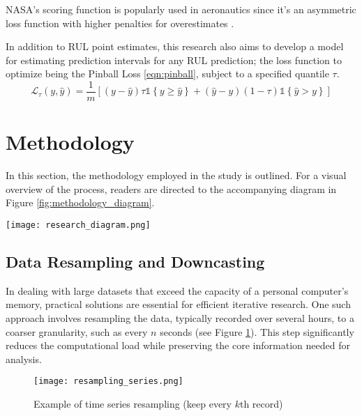 \documentclass{IEEEtran}
\begin{document}
            NASA's scoring function is popularly used in aeronautics since it's an asymmetric loss function with higher penalties for overestimates \cite{saxena2008damage}.

            In addition to RUL point estimates, this research also aims to develop a model for estimating prediction intervals for any RUL prediction; the loss function to optimize being the Pinball Loss \eqref{eqn:pinball}, subject to a specified quantile $\tau$.
            \begin{equation}\label{eqn:pinball}
                \mathcal{L}_\tau(y, \hat{y}) = \frac{1}{m} \left[(y - \hat{y}) \tau \mathds{1} \left\{y \geq \hat{y}\right\} + (\hat{y} - y) (1 - \tau) \mathds{1} \left\{\hat{y} > y\right\} \right]
            \end{equation}

    \section{Methodology} \label{sec:methodology}

        In this section, the methodology employed in the study is outlined. For a visual overview of the process, readers are directed to the accompanying diagram in Figure \ref{fig:methodology_diagram}.
        \begin{figure*}[!htbp]
            \centering
            \texttt{[image: research\_diagram.png]}
            \caption{Proposed Methodology Overview}
            \label{fig:methodology_diagram}
        \end{figure*}

        \subsection{Data Resampling and Downcasting} \label{sec:resampling}

            In dealing with large datasets that exceed the capacity of a personal computer's memory, practical solutions are essential for efficient iterative research. One such approach involves resampling the data, typically recorded over several hours, to a coarser granularity, such as every $n$ seconds (see Figure \ref{fig:resampling}). This step significantly reduces the computational load while preserving the core information needed for analysis.
            \begin{figure}[!htbp]
                \centering
                \texttt{[image: resampling\_series.png]}
                \caption{Example of time series resampling (keep every $k$th record)}
                \label{fig:resampling}
            \end{figure}
\end{document}
